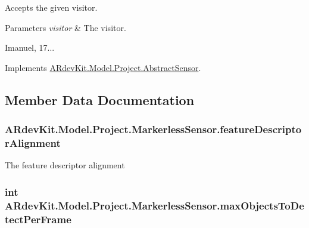 Accepts the given visitor. 


\begin{DoxyParams}{Parameters}
{\em visitor} & The visitor. \\
\hline
\end{DoxyParams}


Imanuel, 17... 

Implements \hyperlink{class_a_rdev_kit_1_1_model_1_1_project_1_1_abstract_sensor_a4ff825b76bdd9f01a93ca670d02c219c}{A\-Rdev\-Kit.\-Model.\-Project.\-Abstract\-Sensor}.



\subsection{Member Data Documentation}
\hypertarget{class_a_rdev_kit_1_1_model_1_1_project_1_1_markerless_sensor_aa6e040afed0bb46eb2c0fcda8954c1e1}{
\subsubsection[{feature\-Descriptor\-Alignment}]{ A\-Rdev\-Kit.\-Model.\-Project.\-Markerless\-Sensor.\-feature\-Descriptor\-Alignment\hspace{0.3cm}{\ttfamily [protected]}}}\label{class_a_rdev_kit_1_1_model_1_1_project_1_1_markerless_sensor_aa6e040afed0bb46eb2c0fcda8954c1e1}


The feature descriptor alignment 

\hypertarget{class_a_rdev_kit_1_1_model_1_1_project_1_1_markerless_sensor_a49898575f95f56a267a82cca2b258134}{
\subsubsection[{max\-Objects\-To\-Detect\-Per\-Frame}]{\setlength{\rightskip}{0pt plus 5cm}int A\-Rdev\-Kit.\-Model.\-Project.\-Markerless\-Sensor.\-max\-Objects\-To\-Detect\-Per\-Frame\hspace{0.3cm}{\ttfamily [protected]}}}\label{class_a_rdev_kit_1_1_model_1_1_project_1_1_markerless_sensor_a49898575f95f56a267a82cca2b258134}


